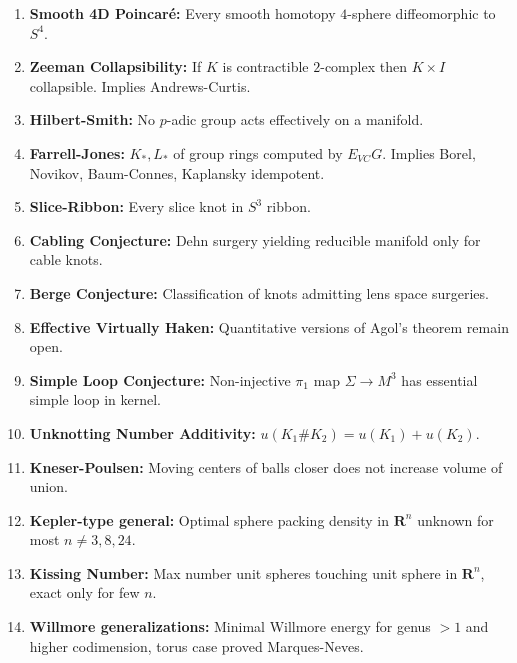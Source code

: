 \documentclass[aps,prd,amsmath,amssymb,twocolumn,superscriptaddress]{revtex4-2}
\begin{document}
\begin{enumerate}[label={\bf \arabic*.}, leftmargin=*, itemsep=2pt]

\item \textbf{Smooth 4D Poincar\'e:} Every smooth homotopy $4$-sphere diffeomorphic to $S^4$.

\item \textbf{Zeeman Collapsibility:} If $K$ is contractible $2$-complex then $K\times I$ collapsible. Implies Andrews-Curtis.

\item \textbf{Hilbert-Smith:} No $p$-adic group acts effectively on a manifold.

\item \textbf{Farrell-Jones:} $K_*,L_*$ of group rings computed by $E_{VC}G$. Implies Borel, Novikov, Baum-Connes, Kaplansky idempotent.

\item \textbf{Slice-Ribbon:} Every slice knot in $S^3$ ribbon.

\item \textbf{Cabling Conjecture:} Dehn surgery yielding reducible manifold only for cable knots.

\item \textbf{Berge Conjecture:} Classification of knots admitting lens space surgeries.

\item \textbf{Effective Virtually Haken:} Quantitative versions of Agol's theorem remain open.

\item \textbf{Simple Loop Conjecture:} Non-injective $\pi_1$ map $\Sigma\to M^3$ has essential simple loop in kernel.

\item \textbf{Unknotting Number Additivity:} $u(K_1\#K_2)=u(K_1)+u(K_2)$.

\item \textbf{Kneser-Poulsen:} Moving centers of balls closer does not increase volume of union.

\item \textbf{Kepler-type general:} Optimal sphere packing density in $\mathbf R^n$ unknown for most $n\neq3,8,24$.

\item \textbf{Kissing Number:} Max number unit spheres touching unit sphere in $\mathbf R^n$, exact only for few $n$.

\item \textbf{Willmore generalizations:} Minimal Willmore energy for genus $>1$ and higher codimension, torus case proved Marques-Neves.


\end{enumerate}
\end{document}
